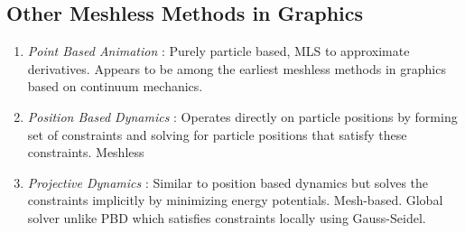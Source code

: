 \subsection{Other Meshless Methods in Graphics}
\begin{enumerate}
    \item \textit{Point Based Animation }\cite{10.1145/1028523.1028542}: Purely particle based, MLS to approximate derivatives. Appears to be among the earliest meshless methods in graphics based on continuum mechanics. 
    \item \textit{Position Based Dynamics} \cite{MULLER2007109}: Operates directly on particle positions by forming set of constraints and solving for particle positions that satisfy these constraints. Meshless
    \item \textit{Projective Dynamics} \cite{10.1145/2601097.2601116}: Similar to position based dynamics but solves the constraints implicitly by minimizing energy potentials. Mesh-based. Global solver unlike PBD which satisfies constraints locally using Gauss-Seidel.
\end{enumerate}

